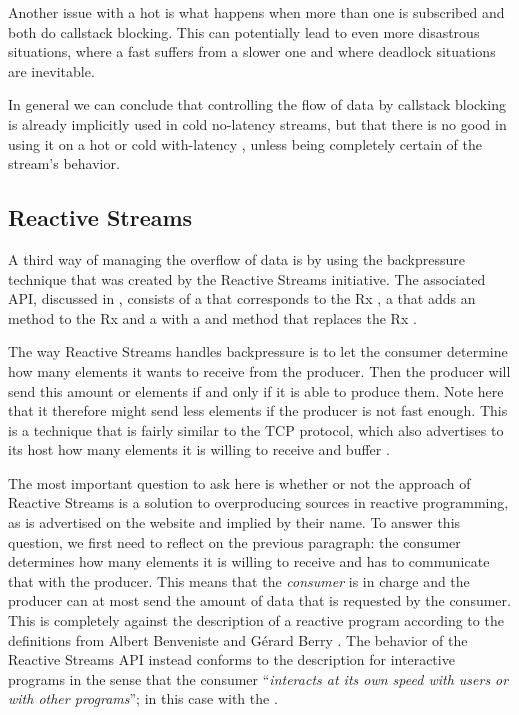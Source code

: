 Another issue with a hot \obs is what happens when more than one \obv is subscribed and both do callstack blocking. This can potentially lead to even more disastrous situations, where a fast \obv suffers from a slower one and where deadlock situations are inevitable.

In general we can conclude that controlling the flow of data by callstack blocking is already implicitly used in cold no-latency streams, but that there is no good in using it on a hot or cold with-latency \obs, unless being completely certain of the stream's behavior.

\subsection{Reactive Streams}
\label{subsec:handling-overproduction-with-reactive-streams}
A third way of managing the overflow of data is by using the backpressure technique that was created by the Reactive Streams initiative. The associated API, discussed in , consists of a  that corresponds to the Rx \obs, a  that adds an  method to the Rx \obv and a  with a  and  method that replaces the Rx \subs.

The way Reactive Streams handles backpressure is to let the consumer determine how many elements it wants to receive from the producer. Then the producer will send this amount or elements if and only if it is able to produce them. Note here that it therefore might send less elements if the producer is not fast enough. This is a technique that is fairly similar to the TCP protocol, which also advertises to its host how many elements it is willing to receive and buffer \cite{tanenbaum2011-Computer-Networks}.

The most important question to ask here is whether or not the approach of Reactive Streams is a solution to overproducing sources in reactive programming, as is advertised on the website \cite{Reactive-Streams} and implied by their name. To answer this question, we first need to reflect on the previous paragraph: the consumer determines how many elements it is willing to receive and has to communicate that with the producer. This means that the \emph{consumer} is in charge and the producer can at most send the amount of data that is requested by the consumer. This is completely against the description of a reactive program according to the definitions from Albert Benveniste and G\'erard Berry \cite{berry1991-Reactive}. The behavior of the Reactive Streams API instead conforms to the description for interactive programs in the sense that the consumer ``\textit{interacts at its own speed with users or with other programs}''; in this case with the .

